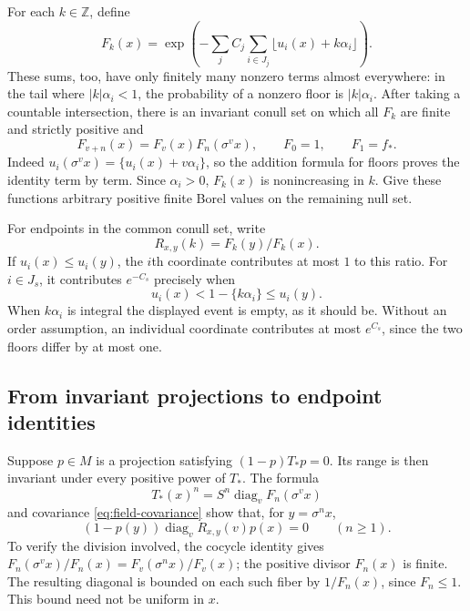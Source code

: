For each $k\in\mathbb Z$, define
\begin{equation}\label{eq:cocycle-definition}
 F_k(x)=\exp\left(-\sum_j C_j\sum_{i\in J_j}
                     \lfloor u_i(x)+k\alpha_i\rfloor\right).
\end{equation}
These sums, too, have only finitely many nonzero terms almost everywhere:
in the tail where $|k|\alpha_i<1$, the probability of a nonzero floor is
$|k|\alpha_i$.  After taking a countable intersection, there is an invariant
conull set on which all $F_k$ are finite and strictly positive and
\begin{equation}\label{eq:cocycle-identities}
 F_{v+n}(x)=F_v(x)F_n(\sigma^v x),\qquad F_0=1,\qquad F_1=f_*.
\end{equation}
Indeed $u_i(\sigma^v x)=\{u_i(x)+v\alpha_i\}$, so the addition formula for
floors proves the identity term by term.  Since $\alpha_i>0$, $F_k(x)$ is
nonincreasing in $k$.  Give these functions arbitrary positive finite Borel
values on the remaining null set.

For endpoints in the common conull set, write
\[
 R_{x,y}(k)=F_k(y)/F_k(x).
\]
If $u_i(x)\le u_i(y)$, the $i$th coordinate contributes at most $1$ to
this ratio.  For $i\in J_s$, it contributes $e^{-C_s}$ precisely when
\begin{equation}\label{eq:ratio-crossing}
 u_i(x)<1-\{k\alpha_i\}\le u_i(y).
\end{equation}
When $k\alpha_i$ is integral the displayed event is empty, as it should be.
Without an order assumption, an individual coordinate contributes at most
$e^{C_s}$, since the two floors differ by at most one.

\subsection{From invariant projections to endpoint identities}

Suppose $p\in M$ is a projection satisfying $(1-p)T_*p=0$.  Its range is
then invariant under every positive power of $T_*$.  The formula
\[
 T_*(x)^n=S^n\operatorname{diag}_v F_n(\sigma^v x)
\]
and covariance \eqref{eq:field-covariance} show that, for $y=\sigma^n x$,
\begin{equation}\label{eq:positive-orbit-identity}
 (1-p(y))\operatorname{diag}_v R_{x,y}(v)p(x)=0\qquad(n\ge1).
\end{equation}
To verify the division involved, the cocycle identity gives
$F_n(\sigma^v x)/F_n(x)=F_v(\sigma^n x)/F_v(x)$; the positive divisor
$F_n(x)$ is finite.  The resulting diagonal is bounded on each such fiber
by $1/F_n(x)$, since $F_n\le1$.  This bound need not be uniform in $x$.

